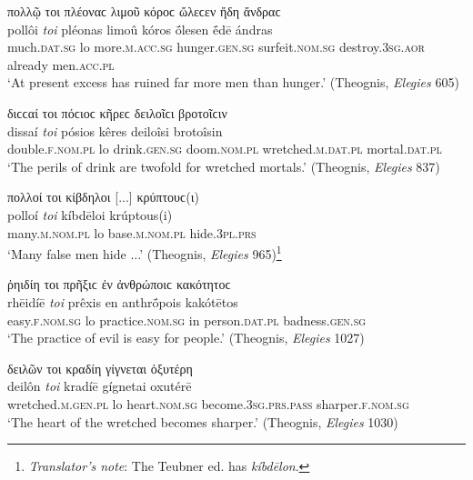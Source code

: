 \begin{exe}
\ex πολλῷ τοι πλέοναϲ λιμοῦ κόροϲ ὤλεϲεν ἤδη ἄνδραϲ\\
\gll pollôi \emph{toi} pléonas limoû kóros ṓlesen ḗdē ándras\\
much.\textsc{dat.sg} lo more.\textsc{m.acc.sg} hunger.\textsc{gen.sg} surfeit.\textsc{nom.sg} destroy.\textsc{3sg.aor} already men.\textsc{acc.pl}\\
\trans `At present excess has ruined far more men than hunger.' (Theognis, \textit{Elegies} 605)
\label{toi16}
\end{exe}

\begin{exe}
\ex διϲϲαί τοι πόϲιοϲ κῆρεϲ δειλοῖϲι βροτοῖϲιν\\
\gll dissaí \emph{toi} pósios kêres deiloîsi brotoîsin\\
double.\textsc{f.nom.pl} lo drink.\textsc{gen.sg} doom.\textsc{nom.pl}
wretched.\textsc{m.dat.pl} mortal.\textsc{dat.pl}\\
\trans `The perils of drink are twofold for wretched mortals.' (Theognis, \textit{Elegies} 837)
\label{toi17}
\end{exe}

\begin{exe}
\ex πολλοί τοι κίβδηλοι {[}...{]} κρύπτουϲ(ι)\\
\gll polloí \emph{toi} kíbdēloi krúptous(i)\\
many.\textsc{m.nom.pl} lo base.\textsc{m.nom.pl} hide.\textsc{3pl.prs}\\
\trans `Many false men hide ...' (Theognis, \textit{Elegies} 965)\footnote{\emph{Translator's note}: The Teubner ed. \citep{Hiller1890} has \textit{kíbdēlon}.}
\label{toi18}
\end{exe}

\begin{exe}
\ex ῥηιδίη τοι πρῆξιϲ ἐν ἀνθρώποιϲ κακότητοϲ\\
\gll rhēidíē \emph{toi} prêxis en anthrṓpois kakótētos\\
easy.\textsc{f.nom.sg} lo practice.\textsc{nom.sg} in person.\textsc{dat.pl} badness.\textsc{gen.sg}\\
\trans `The practice of evil is easy for people.' (Theognis, \textit{Elegies} 1027)
\label{toi19}
\end{exe}

\begin{exe}
\ex δειλῶν τοι κραδίη γίγνεται ὀξυτέρη\\
\gll deilôn \emph{toi} kradíē gígnetai oxutérē\\ 
wretched.\textsc{m.gen.pl} lo heart.\textsc{nom.sg} become.\textsc{3sg.prs.pass} sharper.\textsc{f.nom.sg}\\
\trans `The heart of the wretched becomes sharper.' (Theognis, \textit{Elegies} 1030)
\label{toi20}
\end{exe}

